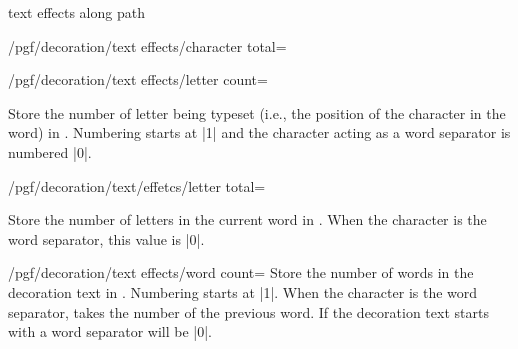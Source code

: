 \begin{decoration}{text effects along path}
\begin{key}{/pgf/decoration/text effects/character total=}
\begin{codeexample}[]
\end{codeexample}

\end{key}

\begin{key}{/pgf/decoration/text effects/letter count=}

  Store the number of letter being typeset (i.e., the position of the character
  in the word) in . Numbering starts at |1| and
  the character acting as a word separator is numbered |0|.
  
\begin{codeexample}[]
\end{codeexample}

\end{key}

\begin{key}{/pgf/decoration/text/effetcs/letter total=}

  Store the number of letters in the current word in .
  When the character is the word separator, this value is |0|.

\end{key}

\begin{key}{/pgf/decoration/text effects/word count=}
   Store the number of words in the decoration text in	. 
   Numbering starts at |1|.
 		When the character is the word separator, 
 		takes the number of the previous word. If the decoration text
 		starts with a word separator  will be |0|.

\begin{codeexample}[]
\begin{tikzpicture}[decoration={text effects along path,
  text={text effects along path!},  
  text effects/.cd,
    path from text, word count=\i, every word separator/.style={fill=red!30},
    characters={text along path, shape=circle, fill=gray!50}}]
    

\end{tikzpicture}
\end{codeexample}
\end{key}
\end{decoration}
